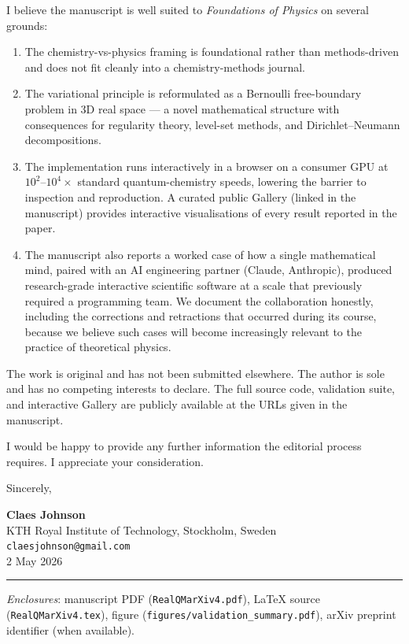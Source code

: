 \documentclass[11pt]{article}
\begin{document}
I believe the manuscript is well suited to \textit{Foundations of Physics} on several grounds:

\begin{enumerate}
\item The chemistry-vs-physics framing is foundational rather than methods-driven and does not fit cleanly into a chemistry-methods journal.
\item The variational principle is reformulated as a Bernoulli free-boundary problem in 3D real space --- a novel mathematical structure with consequences for regularity theory, level-set methods, and Dirichlet--Neumann decompositions.
\item The implementation runs interactively in a browser on a consumer GPU at $10^2$--$10^4 \times$ standard quantum-chemistry speeds, lowering the barrier to inspection and reproduction. A curated public Gallery (linked in the manuscript) provides interactive visualisations of every result reported in the paper.
\item The manuscript also reports a worked case of how a single mathematical mind, paired with an AI engineering partner (Claude, Anthropic), produced research-grade interactive scientific software at a scale that previously required a programming team. We document the collaboration honestly, including the corrections and retractions that occurred during its course, because we believe such cases will become increasingly relevant to the practice of theoretical physics.
\end{enumerate}

The work is original and has not been submitted elsewhere. The author is sole and has no competing interests to declare. The full source code, validation suite, and interactive Gallery are publicly available at the URLs given in the manuscript.

I would be happy to provide any further information the editorial process requires. I appreciate your consideration.

\vspace{1em}

Sincerely,

\vspace{1em}

\textbf{Claes Johnson}\\
KTH Royal Institute of Technology, Stockholm, Sweden\\
\texttt{claesjohnson@gmail.com}\\
2 May 2026

\vspace{1em}

\noindent\rule{\linewidth}{0.4pt}

\textit{Enclosures}: manuscript PDF (\texttt{RealQMarXiv4.pdf}), LaTeX source (\texttt{RealQMarXiv4.tex}), figure (\texttt{figures/validation\_summary.pdf}), arXiv preprint identifier (when available).
\end{document}
